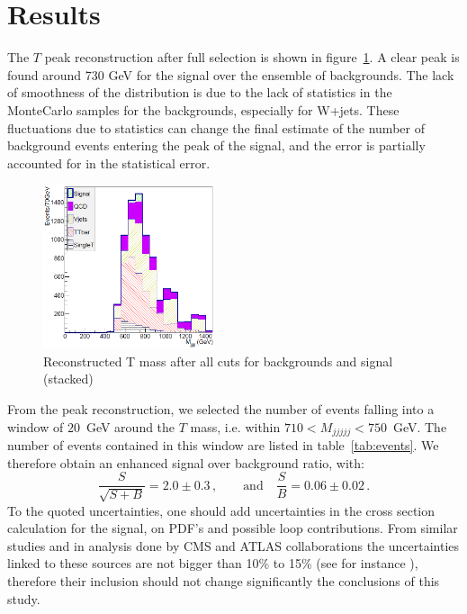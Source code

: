 \section{Results}
\label{sec:Pres}

The $T$ peak reconstruction after full selection is shown in figure~\ref{fig:M5J}. A clear peak is found around 730 GeV for the signal over the ensemble of backgrounds. 
The lack of smoothness of the distribution is due to the lack of statistics in the MonteCarlo samples for the  backgrounds, especially for W+jets. These fluctuations due to statistics can change the final estimate of the number of background events entering the peak of the signal, and the error is partially accounted for in the statistical error. 

\begin{figure}[!Hhtbp]
  \begin{center}
    \includegraphics[width=0.45\textwidth]{figs/Pheno/Final.png}
    \caption{Reconstructed T mass after all cuts for backgrounds and signal (stacked)}
    \label{fig:M5J}
  \end{center}
\end{figure}

From the peak reconstruction, we selected the number of events falling into a window of $20$~GeV around the $T$ mass, i.e. within $710 < M_{jjjjj} < 750$~GeV. The number of events contained in this window are listed in table~\ref{tab:events}. We therefore obtain an enhanced signal over background ratio, with:
\begin{equation}
\frac{S}{\sqrt{S+B}}=2.0\pm 0.3\,, \qquad \mbox{and} \quad \frac{S}{B}=0.06\pm 0.02\,. 
\end{equation}
To the quoted uncertainties, one should add uncertainties in the cross section calculation for the signal, on PDF's and possible loop contributions. From similar studies and in analysis done by CMS and ATLAS collaborations the uncertainties linked to these sources are not bigger than 10\% to 15\% (see for instance \cite{Aad:2011yn}), therefore their inclusion should not change significantly the conclusions of this study.

